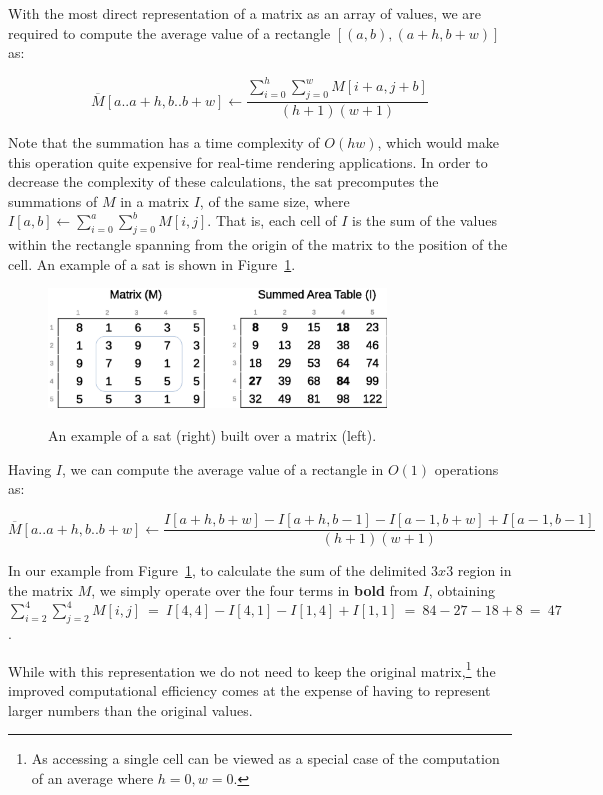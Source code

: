 \documentclass[a4paper,10pt,twoside]{book}
\begin{document}
    With the most direct representation of a matrix as an array of values, we are required to compute the average value of a rectangle $[(a,b),(a+h,b+w)]$ as:
    
    \[
    \overline{M}[a..a+h,b..b+w]\leftarrow
    \frac{\displaystyle\sum^h_{i=0}\displaystyle\sum^w_{j=0}M[i+a,j+b]}
    {(h+1)(w+1)}
    \]
    
    Note that the summation has a time complexity of $O(hw)$, which would make this operation quite expensive for \mbox{real-time} rendering applications. In order to decrease the complexity of these calculations, the \gls{sat} precomputes the summations of $M$ in a matrix $I$, of the same size, where $I[a,b]\leftarrow\displaystyle\sum^a_{i=0}\displaystyle\sum^b_{j=0}M[i,j]$. That is, each cell of $I$ is the sum of the values within the rectangle spanning from the origin of the matrix to the position of the cell. An example of a \gls{sat} is shown in Figure~\ref{fig:sat}.
    
    \begin{figure}[ht]
		\begin{center}
			{\includegraphics[width=0.8\textwidth]{figures/example_sat.eps}}
		\end{center}
		\caption{An example of a \acrlong{sat} (right) built over a matrix (left).}
		\label{fig:sat}
	\end{figure}
    
    Having $I$, we can compute the average value of a rectangle in $O(1)$ operations as:
    
    \[
    \overline{M}[a..a+h,b..b+w]\leftarrow
    \frac{I[a+h,b+w] - I[a+h,b-1] - I[a-1,b+w] + I[a-1,b-1]}
    {(h+1)(w+1)}
    \]
    
    In our example from Figure~\ref{fig:sat}, to calculate the sum of the delimited $3x3$ region in the matrix $M$, we simply operate over the four terms in \textbf{bold} from $I$, obtaining
    $\displaystyle\sum^4_{i=2}\displaystyle\sum^4_{j=2}M[i,j]~=~I[4,4]-I[4,1]-I[1,4]+I[1,1]~=~84-27-18+8~=~47$.
    
    While with this representation we do not need to keep the original matrix,\footnote{As accessing a single cell can be viewed as a special case of the computation of an average where $h=0,w=0$.} the improved computational efficiency comes at the expense of having to represent larger numbers than the original values.
	
\end{document}
